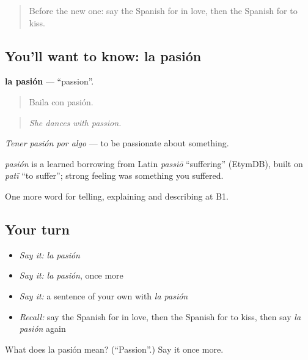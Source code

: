 \label{lesson:ES-C715-pasion}



\begin{quote}
Before the new one: say the Spanish for in love, then the Spanish for to kiss.
\end{quote}

\subsection*{You'll want to know: la pasión}
\textbf{la pasión} — \textquotedblleft{}passion\textquotedblright{}.

\begin{quote}
Baila con pasión.
\end{quote}

\begin{quote}
\emph{She dances with passion.}
\end{quote}

\emph{Tener pasión por algo} — to be passionate about something.

\begin{cousinweb}
\emph{pasión} is a learned borrowing from Latin \emph{passiō} \textquotedblleft{}suffering\textquotedblright{} (EtymDB), built on \emph{patī} \textquotedblleft{}to suffer\textquotedblright{}; strong feeling was something you suffered.
\end{cousinweb}

\begin{grammarlens}[title={What you've built}]
One more word for telling, explaining and describing at B1.
\end{grammarlens}

\subsection*{Your turn}
\begin{itemize}
\raggedright
  \item \emph{Say it:} \emph{la pasión}
  \item \emph{Say it:} \emph{la pasión}, once more
  \item \emph{Say it:} a sentence of your own with \emph{la pasión}
  \item \emph{Recall:} say the Spanish for in love, then the Spanish for to kiss, then say \emph{la pasión} again
\end{itemize}

\begin{tcolorbox}[breakable,colback=teal!4,colframe=teal!35!black,title={Before you move on}]
What does la pasión mean? (\textquotedblleft{}Passion\textquotedblright{}.) Say it once more.
\end{tcolorbox}
